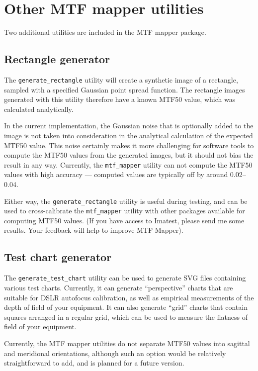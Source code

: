 \documentclass[a4paper]{article}
\begin{document}
\section{Other MTF mapper utilities}
Two additional utilities are included in the MTF mapper package.
\subsection{Rectangle generator}
The \texttt{generate\_rectangle} utility will create a synthetic image of a
rectangle, sampled with a specified Gaussian point spread function. The
rectangle images generated with this utility therefore have a known MTF50
value, which was calculated analytically.

In the current implementation, the Gaussian noise that is optionally added
to the image is not taken into consideration in the analytical calculation
of the expected MTF50 value. This noise certainly makes it more challenging
for software tools to compute the MTF50 values from the generated images,
but it should not bias the result in any way. Currently, the
\texttt{mtf\_mapper} utility can not compute the MTF50 values with high
accuracy --- computed values are typically off by around 0.02--0.04.

Either way, the \texttt{generate\_rectangle} utility is useful during
testing, and can be used to cross-calibrate the \texttt{mtf\_mapper} utility
with other packages available for computing MTF50 values. (If you have
access to Imatest, please send me some results. Your feedback will help to
improve MTF Mapper).

\subsection{Test chart generator}
The \texttt{generate\_test\_chart} utility can be used to generate SVG files
containing various test charts. Currently, it can generate ``perspective''
charts that are suitable for DSLR autofocus calibration, as well as
empirical measurements of the depth of field of your equipment. It can also
generate ``grid'' charts that contain squares arranged in a regular grid,
which can be used to measure the flatness of field of your
equipment.

Currently, the MTF mapper utilities do not separate MTF50 values into
sagittal and meridional orientations, although such an option would be
relatively straightforward to add, and is planned for a future version.
\end{document}
